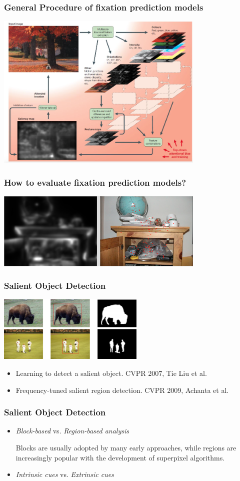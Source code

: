 \documentclass[notheorems,serif,table,compress]{beamer}  %
\begin{document}
\begin{frame}
\frametitle{General Procedure of fixation prediction models}
\centering\includegraphics[width=10cm]{fixationArchitecture}
\end{frame}


\begin{frame}
\frametitle{How to evaluate fixation prediction models?}
\centering\includegraphics[width=10cm]{evaluateFixationModel}
\end{frame}


\begin{frame}
\frametitle{Salient Object Detection}
\centering\includegraphics[width=7cm]{FT.png}
\begin{itemize}
\item Learning to detect a salient object. CVPR 2007, Tie Liu et al.
\item Frequency-tuned salient region detection. CVPR 2009, Achanta et al.
\end{itemize}
\end{frame}


\begin{frame}
\frametitle{Salient Object Detection}
\begin{itemize}
\item {\color{blue}\emph{Block-based}} vs. {\color{blue}\emph{Region-based analysis}}

Blocks are usually adopted by many early approaches, while regions are increasingly popular with the development of superpixel algorithms.

\item {\color{blue}\emph{Intrinsic cues}} vs. {\color{blue}\emph{Extrinsic cues}}
\end{itemize}
\end{frame}
\end{document}
